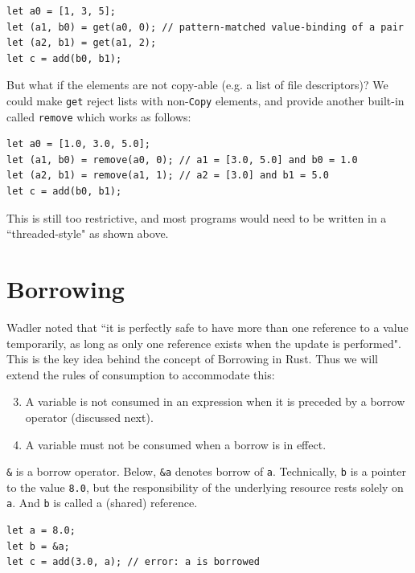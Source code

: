 \documentclass[11pt]{report}
\begin{document}
\begin{lstlisting}
let a0 = [1, 3, 5];
let (a1, b0) = get(a0, 0); // pattern-matched value-binding of a pair
let (a2, b1) = get(a1, 2);
let c = add(b0, b1);
\end{lstlisting}

But what if the elements are not copy-able (e.g. a list of file descriptors)? We could make \texttt{get} reject lists with non-\texttt{Copy} elements, and provide another built-in called \texttt{remove} which works as follows:

\begin{lstlisting}
let a0 = [1.0, 3.0, 5.0];
let (a1, b0) = remove(a0, 0); // a1 = [3.0, 5.0] and b0 = 1.0
let (a2, b1) = remove(a1, 1); // a2 = [3.0] and b1 = 5.0
let c = add(b0, b1);
\end{lstlisting}

This is still too restrictive, and most programs would need to be written in a ``threaded-style" as shown above.

\section*{Borrowing}

Wadler noted that ``it is perfectly safe to have more than one reference to a value temporarily, as long as only one reference exists when the update is performed"\cite{linearchange}. This is the key idea behind the concept of Borrowing in Rust. Thus we will extend the rules of consumption to accommodate this:

\begin{enumerate}
\setcounter{enumi}{2}
\item A variable is not consumed in an expression when it is preceded by a borrow operator (discussed next).
\item A variable must not be consumed when a borrow is in effect.
\end{enumerate}

\texttt{\&} is a borrow operator. Below, \texttt{\&a} denotes borrow of \texttt{a}. Technically, \texttt{b} is a pointer to the value \texttt{8.0}, but the responsibility of the underlying resource rests solely on \texttt{a}. And \texttt{b} is called a (shared) reference.

\begin{lstlisting}
let a = 8.0;
let b = &a;
let c = add(3.0, a); // error: a is borrowed
\end{lstlisting}

\newpage
\end{document}
